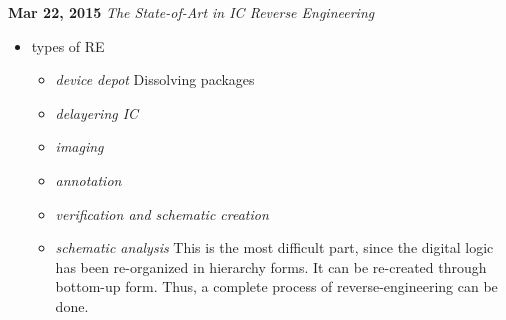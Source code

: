 \documentclass[]{article}
\begin{document}
\noindent \textbf{Mar 22, 2015}
\textit{The State-of-Art in IC Reverse Engineering}
\indent     \begin{itemize}
                \item types of RE
                \begin{itemize}
                    \item \textit{device depot} Dissolving packages
                    \item \textit{delayering IC}
                    \item \textit{imaging}
                    \item \textit{annotation}
                    \item \textit{verification and schematic creation}
                    \item \textit{schematic analysis} This is the most difficult
                    part, since the digital logic has been re-organized in
                    hierarchy forms. It can be re-created through bottom-up
                    form. Thus, a complete process of reverse-engineering can be
                    done.
                \end{itemize} 
            \end{itemize}    
\end{document}
